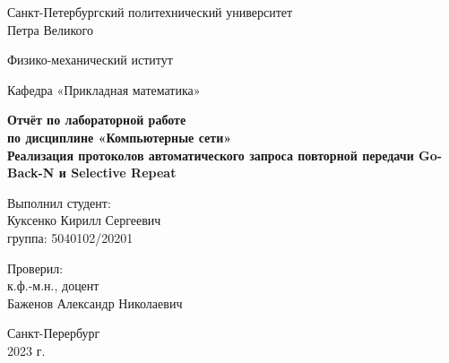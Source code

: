 \begin{titlepage}
	\begin{center}
		{\large Санкт-Петербургский политехнический университет\\Петра Великого\\}
	\end{center}
	
	\begin{center}
		{\large Физико-механический иститут}
	\end{center}
	
	
	\begin{center}
		{\large Кафедра «Прикладная математика»}
	\end{center}
	
	\vspace{8em}
	
	\begin{center}
		{\bfseries Отчёт по лабораторной работе \\по дисциплине «Компьютерные сети» \\Реализация протоколов автоматического запроса повторной передачи Go-Back-N и Selective Repeat }
	\end{center}
	
	\vspace{4em}
	
	\begin{flushleft}
		\hspace{16em}Выполнил студент:\\\hspace{16em}Куксенко Кирилл Сергеевич\\\hspace{16em}группа: 5040102/20201
		
		\vspace{2em}
		
		\hspace{16em}Проверил:\\\hspace{16em}к.ф.-м.н., доцент\\\hspace{16em}Баженов Александр Николаевич
		
	\end{flushleft}
	
	
	\vspace{6em}
	
	
	\begin{center}
		Санкт-Перербург\\2023 г.
	\end{center}	
	
\end{titlepage}
